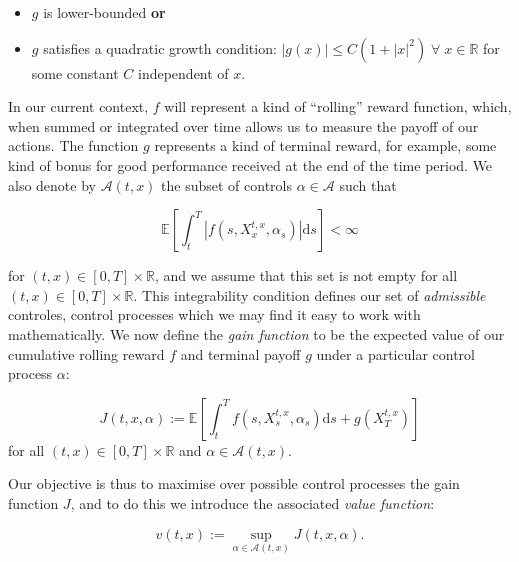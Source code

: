 \begin{itemize}
    \item $g$ is lower-bounded \textbf{or}
    \item $g$ satisfies a quadratic growth condition: $|g(x)|\leq C(1+|x|^2)\;\forall\;x\in\mathbb{R}$ for some constant $C$ independent of $x$.
\end{itemize}

In our current context, $f$ will represent a kind of ``rolling'' reward function, 
which, when summed or integrated over time allows us to measure the payoff of 
our actions. The function $g$ represents a kind of terminal reward, for example, 
some kind of bonus for good performance received at the end of the time period.
We also denote by $\mathcal{A}(t,x)$ the subset of controls $\alpha\in\mathcal{A}$ 
such that

\begin{equation}
    \mathbb{E}\left[\int_t^T|f(s,X_x^{t,x},\alpha_s)|\mathrm ds\right]<\infty
\end{equation}

for $(t,x)\in[0,T]\times\mathbb{R}$, and we assume that this set is not empty for all 
$(t,x)\in[0,T]\times\mathbb{R}$. This integrability condition defines our set of 
\emph{admissible} controles, control processes which we may find it easy to work 
with mathematically. We now define the \emph{gain function} to be the expected value
of our cumulative rolling reward $f$ and terminal payoff $g$ under a particular 
control process $\alpha$:

\begin{definition}
    \begin{equation}
        J(t,x,\alpha):=\mathbb{E}\left[\int_t^Tf(s,X_s^{t,x},\alpha_s)\mathrm ds+g(X_T^{t,x})\right]
    \end{equation}
    for all $(t,x)\in[0,T]\times\mathbb{R}$ and $\alpha\in\mathcal{A}(t,x).$
\end{definition}

Our objective is thus to maximise over possible control processes the gain function $J$,
and to do this we introduce the associated \emph{value function}:

\begin{definition}
    \begin{equation}\label{eq:2.6}
        v(t,x):=\sup_{\alpha\in\mathcal{A}(t,x)}J(t,x,\alpha).
    \end{equation}
\end{definition}

